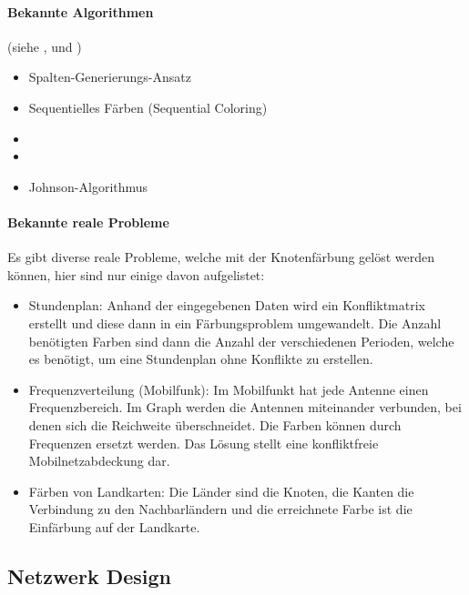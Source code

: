 	\paragraph{Bekannte Algorithmen}
	(siehe \cite{seminar_algo_graph}, \cite{krumke2012graphentheoretische} und \cite{seminar_rob_graphen})
	\begin{itemize}
		\item Spalten-Generierungs-Ansatz
		\item Sequentielles Färben (Sequential Coloring)
		\item {}
		\item {}
		\item Johnson-Algorithmus
	\end{itemize}	

	\paragraph{Bekannte reale Probleme}	
	Es gibt diverse reale Probleme, welche mit der Knotenfärbung gelöst werden können, hier sind nur einige davon aufgelistet:
	\begin{itemize}
		\item Stundenplan: Anhand der eingegebenen Daten wird ein Konfliktmatrix erstellt und diese dann in ein Färbungsproblem umgewandelt. Die Anzahl benötigten Farben sind dann 
			die Anzahl der verschiedenen Perioden, welche es benötigt, um eine Stundenplan ohne Konflikte zu erstellen. \cite{ieee_exam_table_graph_coloring} \cite{time_table_graph_coloring} \cite{timetabling_abdullah}
		\item Frequenzverteilung (Mobilfunk): Im Mobilfunkt hat jede Antenne einen Frequenzbereich. Im Graph werden die Antennen miteinander verbunden, bei denen sich die 
			Reichweite überschneidet. Die Farben können durch Frequenzen ersetzt werden. Das Lösung stellt eine konfliktfreie Mobilnetzabdeckung dar. \cite{seminar_rob_graphen}
		\item Färben von Landkarten: Die Länder sind die Knoten, die Kanten die Verbindung zu den Nachbarländern und die erreichnete Farbe ist die Einfärbung auf der Landkarte. 
			\cite{seminar_rob_graphen}
	\end{itemize}

\newpage
\subsection{Netzwerk Design}\label{network_design}

